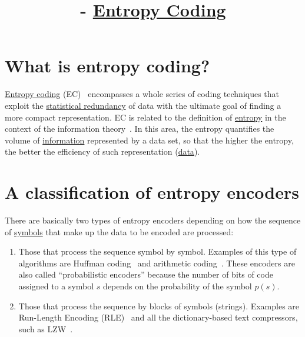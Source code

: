 


\title{\SM{} - \href{https://sistemas-multimedia.github.io/contents/entropy_coding}{Entropy Coding}}

\maketitle

\tableofcontents

\section{What is entropy coding?}

\href{https://en.wikipedia.org/wiki/Entropy_coding}{Entropy coding}
(EC)~\cite{vruiz__entropy_coding} encompasses a whole series of coding
techniques that exploit the
\href{https://en.wikipedia.org/wiki/Redundancy_(information_theory)}{statistical
  redundancy} of data with the ultimate goal of finding a more compact
representation. EC is related to the definition of
\href{https://en.wikipedia.org/wiki/Entropy_(information_theory)}{entropy}
in the context of the information
theory~\cite{vruiz__information_theory}. In this area, the entropy
quantifies the volume of
\href{https://en.wikipedia.org/wiki/Information}{information}
represented by a data set, so that the higher the entropy, the better
the efficiency of such representation
(\href{https://en.wikipedia.org/wiki/Data}{data}).

\section{A classification of entropy encoders}

There are basically two types of entropy encoders depending on how the
sequence of \href{https://en.wikipedia.org/wiki/Symbol}{symbols} that
make up the data to be encoded are processed:

\begin{enumerate}
\item Those that process the sequence symbol by symbol. Examples of
  this type of algorithms are Huffman
  coding~\cite{vruiz__huffman_coding} and arithmetic
  coding~\cite{vruiz__arithmetic_coding}. These encoders are also
  called ``probabilistic encoders'' because the number of bits of code
  assigned to a symbol $s$ depends on the probability of the symbol
  $p(s)$.
\item Those that process the sequence by blocks of symbols
  (strings). Examples are Run-Length Encoding (RLE)~\cite{vruiz__rle}
  and all the dictionary-based text compressors, such as
  LZW~\cite{vruiz__LZW}.
\end{enumerate}
  
